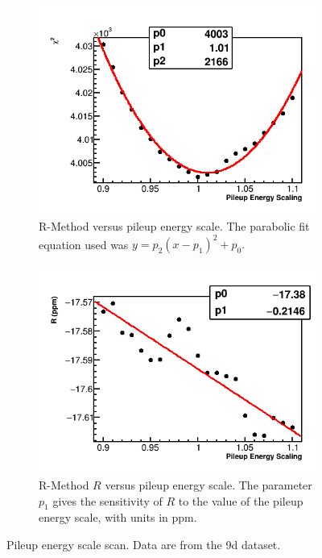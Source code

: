 \begin{figure}
    \begin{subfigure}[t]{0.45\textwidth}
        \centering
        \includegraphics[width=\textwidth]{FullRatio_Chi2_Vs_PileupEnergyScaling_Canv}
        \caption{R-Method \chisq versus pileup energy scale. The parabolic fit equation used was $y = p_{2}(x - p_{1})^{2} + p_{0}.$}
    \end{subfigure}%
    \hspace{1cm}
    \begin{subfigure}[t]{0.45\textwidth}
        \centering
        \includegraphics[width=\textwidth]{FullRatio_R_Vs_PileupEnergyScaling_Canv}
        \caption{R-Method $R$ versus pileup energy scale. The parameter $p_{1}$ gives the sensitivity of $R$ to the value of the pileup energy scale, with units in ppm.}
    \end{subfigure}
\caption[Pileup energy scale scan]{Pileup energy scale scan. Data are from the 9d dataset.}
\label{fig:PESscan}
\end{figure}



